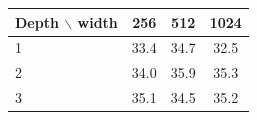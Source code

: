 \begin{tabular}{l ccc}
\toprule
Depth $\backslash$ width & 256 & 512 & 1024 \\
\midrule
1 & 33.4 & 34.7 & 32.5 \\
2 & 34.0 & 35.9 & 35.3 \\
3 & 35.1 & 34.5 & 35.2 \\
\bottomrule
\end{tabular}
